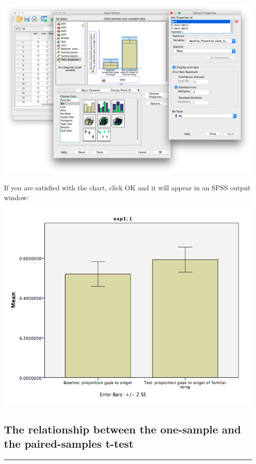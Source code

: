 \documentclass[
]{book}
\begin{document}
\includegraphics{img/6.4.29.png}

If you are satisfied with the chart, click OK and it will appear in an SPSS output window:

\includegraphics{img/6.4.30.png}

\hypertarget{the-relationship-between-the-one-sample-and-the-paired-samples-t-test}{%
\subsection{The relationship between the one-sample and the paired-samples t-test}\label{the-relationship-between-the-one-sample-and-the-paired-samples-t-test}}

\begin{center}\rule{0.5\linewidth}{0.5pt}\end{center}
\end{document}

